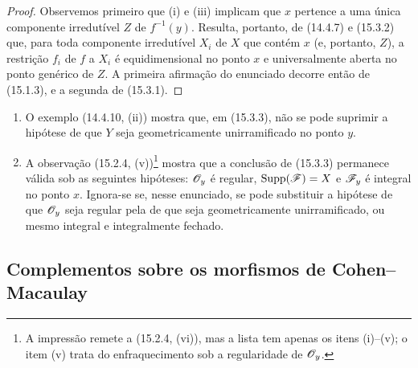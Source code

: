 \begin{proof}
\label{IV.15.3.3-proof}
Observemos primeiro que (i) e (iii) implicam que $x$ pertence a uma única componente irredutível $Z$ de $f^{-1}(y)$. Resulta, portanto, de (14.4.7) e (15.3.2) que, para toda componente irredutível $X_i$ de $X$ que contém $x$ (e, portanto, $Z$), a restrição $f_i$ de $f$ a $X_i$ é equidimensional no ponto $x$ e universalmente aberta no ponto genérico de $Z$. A primeira afirmação do enunciado decorre então de (15.1.3), e a segunda de (15.3.1).
\end{proof}

\begin{remarks}[15.3.4]
\label{IV.15.3.4}
\begin{enumerate}[label=(\roman*)]
  \item O exemplo (14.4.10, (ii)) mostra que, em (15.3.3), não se pode suprimir a hipótese de que $Y$ seja geometricamente unirramificado no ponto $y$.
  \item A observação (15.2.4, (v))\footnote{A impressão remete a (15.2.4, (vi)), mas a lista tem apenas os itens (i)--(v); o item (v) trata do enfraquecimento sob a regularidade de $\mathscr{O}_y$.} mostra que a conclusão de (15.3.3) permanece válida sob as seguintes hipóteses: $\mathscr{O}_y$ é regular, $\operatorname{Supp}(\mathscr{F})=X$ e $\mathscr{F}_y$ é integral no ponto $x$. Ignora-se se, nesse enunciado, se pode substituir a hipótese de que $\mathscr{O}_y$ seja regular pela de que seja geometricamente unirramificado, ou mesmo integral e integralmente fechado.
\end{enumerate}
\end{remarks}

\subsection{Complementos sobre os morfismos de Cohen--Macaulay}
\label{subsection:IV.15.4}

